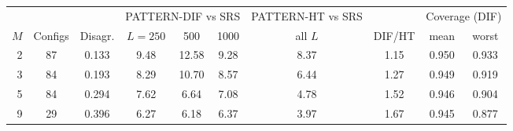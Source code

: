\begin{tabular}{rccccccccc}
\toprule
 & & & \multicolumn{3}{c}{PATTERN-DIF vs SRS} & \multicolumn{1}{c}{PATTERN-HT vs SRS} & & \multicolumn{2}{c}{Coverage (DIF)} \\
\cmidrule(lr){4-6}\cmidrule(lr){9-10}
$M$ & Configs & Disagr. & $L=250$ & 500 & 1000 & all $L$ & DIF/HT & mean & worst \\
\midrule
2 & 87 & 0.133 & 9.48 & 12.58 & 9.28 & 8.37 & 1.15 & 0.950 & 0.933 \\
3 & 84 & 0.193 & 8.29 & 10.70 & 8.57 & 6.44 & 1.27 & 0.949 & 0.919 \\
5 & 84 & 0.294 & 7.62 & 6.64 & 7.08 & 4.78 & 1.52 & 0.946 & 0.904 \\
9 & 29 & 0.396 & 6.27 & 6.18 & 6.37 & 3.97 & 1.67 & 0.945 & 0.877 \\
\bottomrule
\end{tabular}
